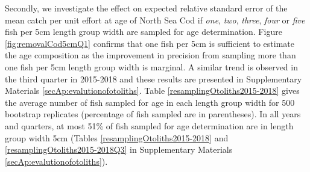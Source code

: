 \documentclass[a4paper 12pt]{article}
\numberwithin{equation}{section}
\begin{document}
Secondly,  we investigate the effect on expected relative standard error of the mean catch per unit effort at age of North Sea Cod if \textit{one}, \textit{two}, \textit{three}, \textit{four} or \textit{five} fish per 5cm length group width are sampled for age determination. Figure  \ref{fig:removalCod5cmQ1} confirms that one fish per 5cm is sufficient to estimate the age composition as the improvement in precision from sampling more than one fish per 5cm length group width is marginal. A similar trend is observed in the third quarter in 2015-2018 and these results are presented  in Supplementary Materials \ref{secAp:evalutionofotoliths}. Table \ref{resamplingOtoliths2015-2018} gives the average number of fish sampled for age in each length group width  for 500 bootstrap replicates (percentage of fish sampled are in parentheses). In all years and quarters, at most 51\% of fish sampled for age determination are in length group width 5cm (Tables \ref{resamplingOtoliths2015-2018} and \ref{resamplingOtoliths2015-2018Q3} in Supplementary Materials \ref{secAp:evalutionofotoliths}). \\
\end{document}
